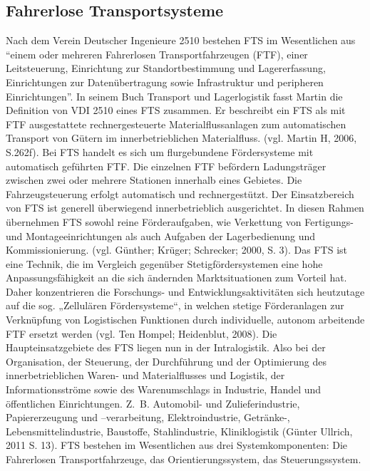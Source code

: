 \subsection{Fahrerlose Transportsysteme}
Nach dem Verein Deutscher Ingenieure 2510 bestehen FTS im Wesentlichen aus "`einem oder mehreren Fahrerlosen Transportfahrzeugen (FTF), einer Leitsteuerung, Einrichtung zur Standortbestimmung und Lagererfassung, Einrichtungen zur Daten\"ubertragung sowie Infrastruktur und peripheren Einrichtungen"'. In seinem Buch Transport und Lagerlogistik fasst Martin die Definition von VDI 2510 eines FTS zusammen. Er beschreibt ein FTS als mit FTF ausgestattete rechnergesteuerte Materialflussanlagen zum automatischen Transport von G\"utern im innerbetrieblichen Materialfluss. (vgl. Martin H, 2006, S.262f). Bei FTS handelt es sich um flurgebundene F\"ordersysteme mit automatisch gef\"uhrten FTF. Die einzelnen FTF bef\"ordern Ladungstr\"ager zwischen zwei oder mehrere Stationen innerhalb eines Gebietes. Die Fahrzeugsteuerung erfolgt automatisch und rechnergest\"utzt. Der Einsatzbereich von FTS ist generell \"uberwiegend innerbetrieblich ausgerichtet. In diesen Rahmen \"ubernehmen FTS sowohl reine F\"orderaufgaben, wie Verkettung von Fertigungs- und Montageeinrichtungen als auch Aufgaben der Lagerbedienung und Kommissionierung. (vgl. G\"unther; Kr\"uger; Schrecker; 2000, S. 3). Das FTS ist eine Technik, die im Vergleich gegen\"uber Stetigf\"ordersystemen eine hohe Anpassungsf\"ahigkeit an die sich \"andernden Marktsituationen zum Vorteil hat. Daher konzentrieren die Forschungs- und Entwicklungsaktivit\"aten sich heutzutage auf die sog. „Zellul\"aren F\"ordersysteme“, in welchen stetige F\"orderanlagen zur Verkn\"upfung von Logistischen Funktionen durch individuelle, autonom arbeitende FTF ersetzt werden (vgl. Ten Hompel; Heidenblut, 2008). Die Haupteinsatzgebiete des FTS liegen nun in der Intralogistik. Also bei der Organisation, der Steuerung, der Durchf\"uhrung und der Optimierung des innerbetrieblichen Waren- und Materialflusses und Logistik, der Informationsstr\"ome sowie des Warenumschlags in Industrie, Handel und \"offentlichen Einrichtungen. Z.~B. Automobil- und Zulieferindustrie, Papiererzeugung und –verarbeitung, Elektroindustrie, Getr\"anke-, Lebensmittelindustrie, Baustoffe, Stahlindustrie, Kliniklogistik (G\"unter Ullrich, 2011 S. 13). FTS bestehen im Wesentlichen aus drei Systemkomponenten: Die Fahrerlosen Transportfahrzeuge, das Orientierungssystem, das Steuerungssystem. 

